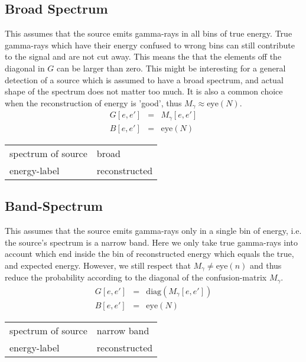 \documentclass{article}%
\begin{document}
    \subsection{Broad Spectrum}
    This assumes that the source emits gamma-rays in all bins of true energy.
    True gamma-rays which have their energy confused to wrong bins can still contribute to the signal and are not cut away.
    This means the that the elements off the diagonal in $G$ can be larger than zero.
    This might be interesting for a general detection of a source which is assumed to have a broad spectrum, and actual shape of the spectrum does not matter too much.
    It is also a common choice when the reconstruction of energy is 'good', thus $M_\gamma \approx \mathrm{eye}(N)$.
    \begin{eqnarray}
        G[e, e'] &=& M_{\gamma}[e, e']
        \\
        B[e, e'] &=& \mathrm{eye}(N)
    \end{eqnarray}
    \begin{center}
        \begin{tabular}{ll}
            spectrum of source & broad\\
            energy-label & reconstructed\\
        \end{tabular}
    \end{center}
    \subsection{Band-Spectrum}
    This assumes that the source emits gamma-rays only in a single bin of energy, i.e. the source's spectrum is a narrow band.
    Here we only take true gamma-rays into account which end inside the bin of reconstructed energy which equals the true, and expected energy.
    However, we still respect that $M_{\gamma} \neq \mathrm{eye}(n)$ and thus reduce the probability according to the diagonal of the confusion-matrix $M_{\gamma}$.
    \begin{eqnarray}
        G[e, e'] &=& \mathrm{diag}(M_{\gamma}[e, e'])
        \\
        B[e, e'] &=& \mathrm{eye}(N)
    \end{eqnarray}
    \begin{center}
        \begin{tabular}{ll}
            spectrum of source & narrow band\\
            energy-label & reconstructed\\
        \end{tabular}
    \end{center}
\end{document}
